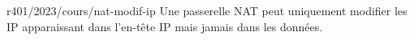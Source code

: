 \begin{question}{r401/2023/cours/nat-modif-ip}
  Une passerelle NAT peut uniquement modifier les IP apparaissant dans
  l'en-tête IP mais jamais dans les données.
  \begin{reponseshoriz}
  \end{reponseshoriz}
\end{question}
